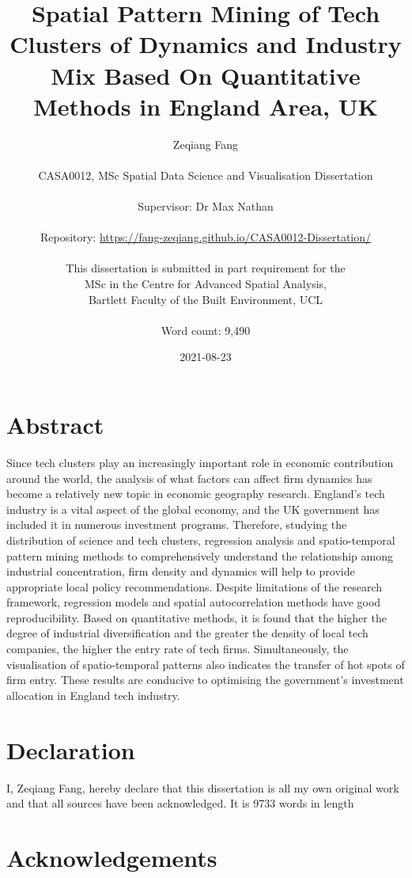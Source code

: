 \documentclass[
  12pt,
  oneside]{book}
\title{Spatial Pattern Mining of Tech Clusters of Dynamics and Industry Mix Based On Quantitative Methods in England Area, UK}
\author{Zeqiang Fang\\
~\\
CASA0012, MSc Spatial Data Science and Visualisation Dissertation\\
~\\
Supervisor: Dr Max Nathan\\
~\\
Repository: \url{https://fang-zeqiang.github.io/CASA0012-Dissertation/}\\
~\\
This dissertation is submitted in part requirement for the\\
MSc in the Centre for Advanced Spatial Analysis,\\
Bartlett Faculty of the Built Environment, UCL\\
~\\
Word count: 9,490}
\date{2021-08-23}
\begin{document}
\maketitle


\hypertarget{abstract}{%
\chapter*{Abstract}\label{abstract}}

Since tech clusters play an increasingly important role in economic contribution around the world, the analysis of what factors can affect firm dynamics has become a relatively new topic in economic geography research. England's tech industry is a vital aspect of the global economy, and the UK government has included it in numerous investment programs. Therefore, studying the distribution of science and tech clusters, regression analysis and spatio-temporal pattern mining methods to comprehensively understand the relationship among industrial concentration, firm density and dynamics will help to provide appropriate local policy recommendations. Despite limitations of the research framework, regression models and spatial autocorrelation methods have good reproducibility. Based on quantitative methods, it is found that the higher the degree of industrial diversification and the greater the density of local tech companies, the higher the entry rate of tech firms. Simultaneously, the visualisation of spatio-temporal patterns also indicates the transfer of hot spots of firm entry. These results are conducive to optimising the government's investment allocation in England tech industry.


\hypertarget{declaration}{%
\chapter*{Declaration}\label{declaration}}

I, Zeqiang Fang, hereby declare that this dissertation is all my own original work and that all sources have been acknowledged. It is 9733 words in length

\hypertarget{acknowledgements}{%
\chapter*{Acknowledgements}\label{acknowledgements}}
\end{document}
